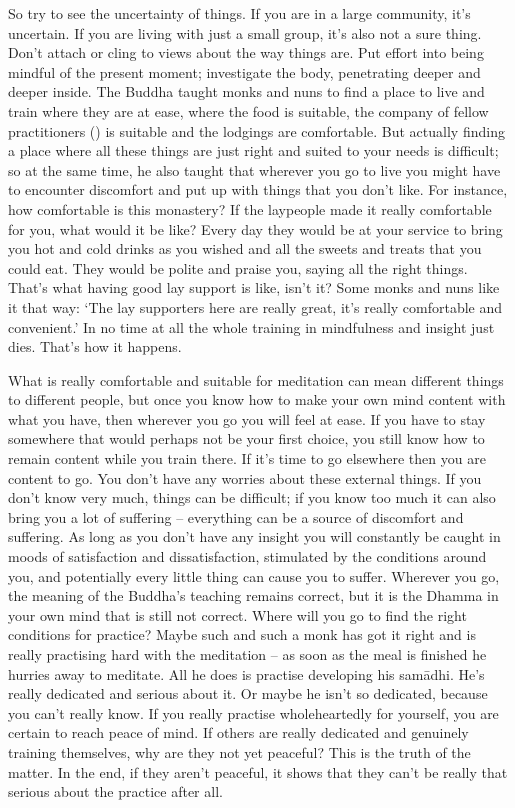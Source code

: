 So try to see the uncertainty of things. If you are in a large community, it's uncertain. If you are living with just a small group, it's also not a sure thing. Don't attach or cling to views about the way things are. Put effort into being mindful of the present moment; investigate the body, penetrating deeper and deeper inside. The Buddha taught monks and nuns to find a place to live and train where they are at ease, where the food is suitable, the company of fellow practitioners () is suitable and the lodgings are comfortable. But actually finding a place where all these things are just right and suited to your needs is difficult; so at the same time, he also taught that wherever you go to live you might have to encounter discomfort and put up with things that you don't like. For instance, how comfortable is this monastery? If the laypeople made it really comfortable for you, what would it be like? Every day they would be at your service to bring you hot and cold drinks as you wished and all the sweets and treats that you could eat. They would be polite and praise you, saying all the right things. That's what having good lay support is like, isn't it? Some monks and nuns like it that way: `The lay supporters here are really great, it's really comfortable and convenient.' In no time at all the whole training in mindfulness and insight just dies. That's how it happens. 

What is really comfortable and suitable for meditation can mean different things to different people, but once you know how to make your own mind content with what you have, then wherever you go you will feel at ease. If you have to stay somewhere that would perhaps not be your first choice, you still know how to remain content while you train there. If it's time to go elsewhere then you are content to go. You don't have any worries about these external things. If you don't know very much, things can be difficult; if you know too much it can also bring you a lot of suffering -- everything can be a source of discomfort and suffering. As long as you don't have any insight you will constantly be caught in moods of \mbox{satisfaction} and dissatisfaction, stimulated by the conditions around you, and potentially every little thing can cause you to suffer. Wherever you go, the meaning of the Buddha's teaching remains correct, but it is the Dhamma in your own mind that is still not correct. Where will you go to find the right conditions for practice? Maybe such and such a monk has got it right and is really practising hard with the meditation -- as soon as the meal is finished he hurries away to meditate. All he does is practise developing his sam\=adhi. He's really dedicated and serious about it. Or maybe he isn't so dedicated, because you can't really know. If you really practise wholeheartedly for yourself, you are certain to reach peace of mind. If others are really dedicated and genuinely training themselves, why are they not yet peaceful? This is the truth of the matter. In the end, if they aren't peaceful, it shows that they can't be really that serious about the practice after all. 

